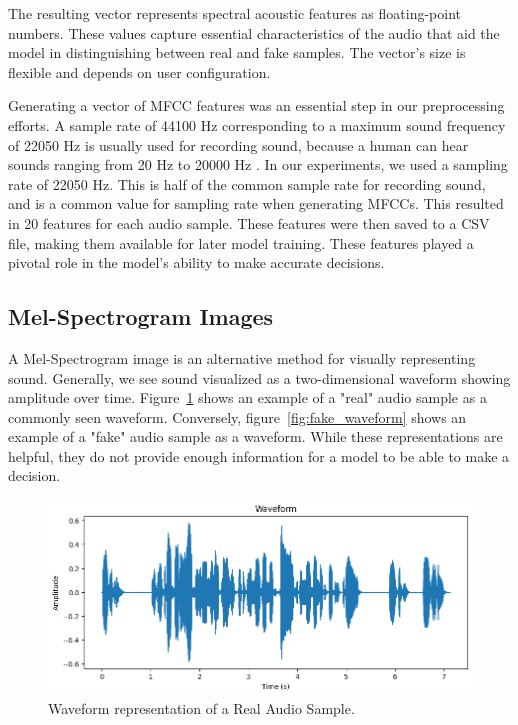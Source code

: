 \documentclass[conference]{IEEEtran}
\begin{document}
The resulting vector represents spectral acoustic features as floating-point numbers. These values capture essential characteristics of the audio that aid the model in distinguishing between real and fake samples. The vector's size is flexible and depends on user configuration. 

Generating a vector of MFCC features was an essential step in our preprocessing efforts. A sample rate of 44100 Hz corresponding to a maximum sound frequency of 22050 Hz is usually used for recording sound, because a human can hear sounds ranging from 20 Hz to 20000 Hz \cite{9252126}. In our experiments, we used a sampling rate of 22050 Hz. This is half of the common sample rate for recording sound, and is a common value for sampling rate when generating MFCCs. This resulted in 20 features for each audio sample. These features were then saved to a CSV file, making them available for later model training. These features played a pivotal role in the model's ability to make accurate decisions.

\subsection{Mel-Spectrogram Images}
A Mel-Spectrogram image is an alternative method for visually representing sound. Generally, we see sound visualized as a two-dimensional waveform showing amplitude over time. Figure~\ref{fig:real_waveform} shows an example of a "real" audio sample as a commonly seen waveform. Conversely, figure~\ref{fig:fake_waveform} shows an example of a "fake" audio sample as a waveform. While these representations are helpful, they do not provide enough information for a model to be able to make a decision. 

\begin{figure}
  \centering
  \includegraphics[width=\linewidth]{images/real_waveform.png}
  \caption{Waveform representation of a Real Audio Sample.}
  \label{fig:real_waveform}
\end{figure}
\end{document}
